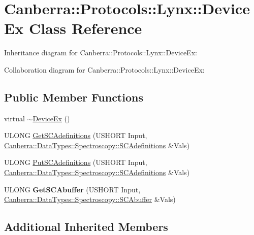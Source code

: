 \hypertarget{class_canberra_1_1_protocols_1_1_lynx_1_1_device_ex}{}\section{Canberra\+:\+:Protocols\+:\+:Lynx\+:\+:Device\+Ex Class Reference}
\label{class_canberra_1_1_protocols_1_1_lynx_1_1_device_ex}


Inheritance diagram for Canberra\+:\+:Protocols\+:\+:Lynx\+:\+:Device\+Ex\+:


Collaboration diagram for Canberra\+:\+:Protocols\+:\+:Lynx\+:\+:Device\+Ex\+:
\subsection*{Public Member Functions}
\begin{DoxyCompactItemize}
\item 
virtual \hyperlink{class_canberra_1_1_protocols_1_1_lynx_1_1_device_ex_adea95d2151bfdecbd6c58f6157cca15d_adea95d2151bfdecbd6c58f6157cca15d}{$\sim$\+Device\+Ex} ()
\item 
U\+L\+O\+NG \hyperlink{class_canberra_1_1_protocols_1_1_lynx_1_1_device_ex_a77bb8d6a288fe6cf56e43839ef1a6195_a77bb8d6a288fe6cf56e43839ef1a6195}{Get\+S\+C\+Adefinitions} (U\+S\+H\+O\+RT Input, \hyperlink{class_canberra_1_1_data_types_1_1_spectroscopy_1_1_s_c_adefinitions}{Canberra\+::\+Data\+Types\+::\+Spectroscopy\+::\+S\+C\+Adefinitions} \&Vals)
\item 
U\+L\+O\+NG \hyperlink{class_canberra_1_1_protocols_1_1_lynx_1_1_device_ex_afd12d1dce85502d5a2aeb4c80b88946b_afd12d1dce85502d5a2aeb4c80b88946b}{Put\+S\+C\+Adefinitions} (U\+S\+H\+O\+RT Input, \hyperlink{class_canberra_1_1_data_types_1_1_spectroscopy_1_1_s_c_adefinitions}{Canberra\+::\+Data\+Types\+::\+Spectroscopy\+::\+S\+C\+Adefinitions} \&Vals)
\item 
\mbox{\label{class_canberra_1_1_protocols_1_1_lynx_1_1_device_ex_af934cb00c0b93efecb001514dc02c461}} 
U\+L\+O\+NG {\bfseries Get\+S\+C\+Abuffer} (U\+S\+H\+O\+RT Input, \hyperlink{class_canberra_1_1_data_types_1_1_spectroscopy_1_1_s_c_abuffer}{Canberra\+::\+Data\+Types\+::\+Spectroscopy\+::\+S\+C\+Abuffer} \&Vals)
\end{DoxyCompactItemize}
\subsection*{Additional Inherited Members}


